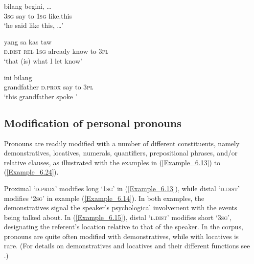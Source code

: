 \ea
\label{Example_6.10}
 {bilang} {} {} {begini,} {\ldots}\\ %
 \textsc{3sg}  say  to  \textsc{1sg}  like.this  \\

\glt
‘he said  like this, {\ldots}’ \textstyleExampleSource{[080917-008-NP.0163]}
\z

\ea
\label{Example_6.11}
 {yang} {sa} {kas} {taw} {} {}\\ %
 \textsc{d.dist}  \textsc{rel}  \textsc{1sg}  already  know  to  \textsc{3pl}\\

\glt
‘that (is) what I let  know’ \textstyleExampleSource{[081006-009-Cv.0010]}
\z

\ea
\label{Example_6.12}
 {ini} {bilang} {} {}\\ %
 grandfather  \textsc{d.prox}  say  to  \textsc{3pl}\\
\glt
‘this grandfather spoke ’ \textstyleExampleSource{[080919-006-CvNP.0011]}

\z


\subsection{Modification of personal pronouns}
\label{Para_6.1.2}
Pronouns are readily modified with a number of different constituents, namely demonstratives, locatives, numerals, quantifiers, prepositional phrases, and/or relative clauses, as illustrated with the examples in (\ref{Example_6.13}) to (\ref{Example_6.24}).



Proximal   ‘\textsc{d.prox}’ modifies long  ‘\textsc{1sg}’ in (\ref{Example_6.13}), while distal  ‘\textsc{d.dist}’ modifies  ‘\textsc{2sg}’ in example (\ref{Example_6.14}). In both examples, the demonstratives signal the speaker's psychological involvement with the events being talked about. In (\ref{Example_6.15}), distal   ‘\textsc{l.dist}’ modifies short  ‘\textsc{3sg}’, designating the referent’s location relative to that of the speaker. In the corpus, pronouns are quite often modified with demonstratives, while  with locatives is rare. (For details on demonstratives and locatives and their different functions see .)




